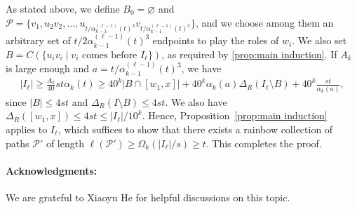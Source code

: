 \documentclass[a4paper,11pt]{article}
\makeatletter
\renewenvironment{proof}[1][\proofname] {\par\pushQED{\qed}\normalfont\topsep6\p@\@plus6\p@\relax\trivlist\item[\hskip\labelsep\bfseries#1\@addpunct{.}]\ignorespaces}{\popQED\endtrivlist\@endpefalse}
\theoremstyle{definition}
\def\cP{\mathcal{P}}
\makeatother
\begin{document}
\begin{proof}[Proof of Theorem~\ref{thm:main}.]
As stated above, we define $B_0=\varnothing$ and $\cP=\{v_1, u_2v_2, \dots, u_{t/\alpha_{k-1}^{(\ell-1)}(t)^3}v_{t/\alpha_{k-1}^{(\ell-1)}(t)^3}\}$, and we choose among them an arbitrary set of $t/2\alpha_{k-1}^{(\ell-1)}(t)^3$ endpoints to play the roles of $w_i$. We also set $B=C(\{u_iv_i\mid  v_i\text{ comes before }I_\ell\})$, as required by \cref{prop:main induction}. If $A_k$ is large enough and $a=t/\alpha_{k-1}^{(\ell-1)}(t)^3$, we have 
\begin{align*}
    |I_\ell|\geq \frac{A_k}{40} st \alpha_k(t)\geq 40^k\big|B\cap [w_1, x]\big|+40^k \alpha_k(a) \Delta_R(I_\ell\setminus B)+40^k\frac{st}{\alpha_k(a)},
\end{align*}
since $|B|\leq 4st$ and $\Delta_R(I\setminus B)\leq 4st$. We also have $\Delta_R([w_1, x])\leq 4st\leq |I_\ell|/10^k$. Hence, Proposition~\ref{prop:main induction} applies to $I_\ell$, which suffices to show that there exists a rainbow collection of paths $\cP'$ of length $\ell(\cP')\geq \Omega_k(|I_\ell|/s)\geq t$. This completes the proof.
\end{proof}

\paragraph{Acknowledgments:} We are grateful to Xiaoyu He for helpful discussions on this topic.
\end{document}
